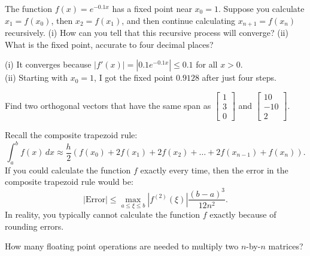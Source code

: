 \documentclass[11pt]{exam}
\newcommand{\ds}{\displaystyle}
\begin{document}
\begin{questions}
\question The function $\ds f(x) = e^{-0.1x}$ has a fixed point near $x_0 = 1$.  Suppose you calculate $x_1 = f(x_0)$, then $x_2 = f(x_1)$, and then continue calculating $x_{n+1} = f(x_n)$ recursively. (i) How can you tell that this recursive process will converge? (ii) What is the fixed point, accurate to four decimal places? 
\begin{solution}
(i) It converges because $|f'(x)| = |0.1e^{-0.1x}| \le 0.1$ for all $x >0$.  \\
(ii) Starting with $x_0=1$, I got the fixed point $0.9128$ after just four steps.
\end{solution}
\vfill

\newpage
\question Find two orthogonal vectors that have the same span as $\begin{bmatrix} 1 \\ 3 \\ 0  \end{bmatrix}$ and $\begin{bmatrix} 10 \\ -10 \\ 2  \end{bmatrix}$. 
\vfill

\question Recall the composite trapezoid rule:
$$\int_a^b f(x) \, dx \approx \frac{h}{2}(f(x_0) + 2f(x_1) + 2f(x_2) + \ldots + 2 f(x_{n-1}) + f(x_n) ).$$
If you could calculate the function $f$ exactly every time, then the error in the composite trapezoid rule would be:
$$|\text{Error}| \le \max_{a \le \xi \le b} |f^{(2)}(\xi)| \frac{(b-a)^3}{12n^2}.$$
In reality, you typically cannot calculate the function $f$ exactly because of rounding errors.  
\vfill

\question How many floating point operations are needed to multiply two $n$-by-$n$ matrices?  
\vfill

\end{questions}
\end{document}
